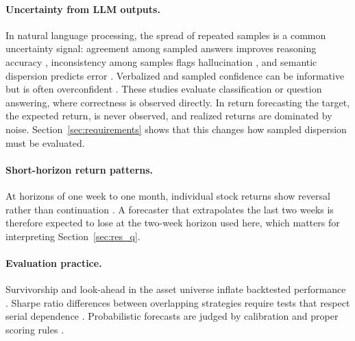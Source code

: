\paragraph{Uncertainty from LLM outputs.}
In natural language processing, the spread of repeated samples is a common uncertainty signal: agreement among sampled answers improves reasoning accuracy \citep{wang2023selfconsistency}, inconsistency among samples flags hallucination \citep{manakul2023selfcheckgpt}, and semantic dispersion predicts error \citep{kuhn2023semantic}. Verbalized and sampled confidence can be informative but is often overconfident \citep{kadavath2022language,lin2022teaching,xiong2024can}. These studies evaluate classification or question answering, where correctness is observed directly. In return forecasting the target, the expected return, is never observed, and realized returns are dominated by noise. Section~\ref{sec:requirements} shows that this changes how sampled dispersion must be evaluated.

\paragraph{Short-horizon return patterns.}
At horizons of one week to one month, individual stock returns show reversal rather than continuation \citep{jegadeesh1990evidence,lehmann1990fads}. A forecaster that extrapolates the last two weeks is therefore expected to lose at the two-week horizon used here, which matters for interpreting Section~\ref{sec:res_q}.

\paragraph{Evaluation practice.}
Survivorship and look-ahead in the asset universe inflate backtested performance \citep{brown1992survivorship,elton1996survivorship}. Sharpe ratio differences between overlapping strategies require tests that respect serial dependence \citep{ledoit2008robust}. Probabilistic forecasts are judged by calibration and proper scoring rules \citep{gneiting2007strictly}.
